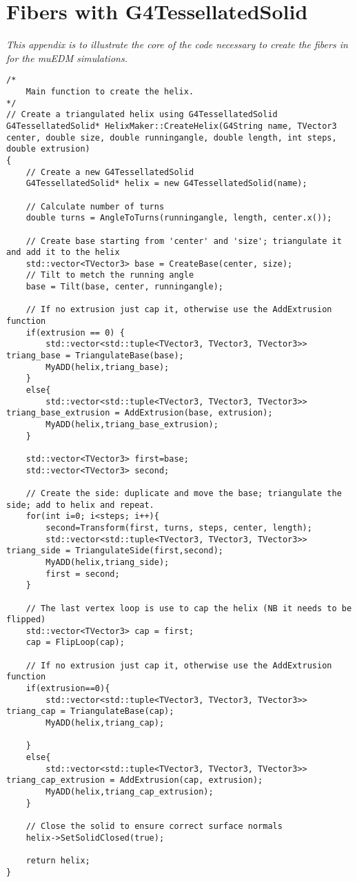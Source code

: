 
\chapter{Fibers with G4TessellatedSolid}
{\itshape
This appendix is to illustrate the core of the code necessary to create the fibers in \gf for the muEDM simulations.}
\label{ch:G4TessellatedSolid}
\begin{lstlisting}
/*
    Main function to create the helix. 
*/
// Create a triangulated helix using G4TessellatedSolid
G4TessellatedSolid* HelixMaker::CreateHelix(G4String name, TVector3 center, double size, double runningangle, double length, int steps, double extrusion)
{
    // Create a new G4TessellatedSolid
    G4TessellatedSolid* helix = new G4TessellatedSolid(name);

    // Calculate number of turns
    double turns = AngleToTurns(runningangle, length, center.x());
	
    // Create base starting from 'center' and 'size'; triangulate it and add it to the helix
	std::vector<TVector3> base = CreateBase(center, size);
    // Tilt to metch the running angle
    base = Tilt(base, center, runningangle);

    // If no extrusion just cap it, otherwise use the AddExtrusion function
    if(extrusion == 0) {
        std::vector<std::tuple<TVector3, TVector3, TVector3>> triang_base = TriangulateBase(base);
	    MyADD(helix,triang_base);
    }
    else{
        std::vector<std::tuple<TVector3, TVector3, TVector3>> triang_base_extrusion = AddExtrusion(base, extrusion);
        MyADD(helix,triang_base_extrusion);
    }

	std::vector<TVector3> first=base;
	std::vector<TVector3> second;

	// Create the side: duplicate and move the base; triangulate the side; add to helix and repeat. 
	for(int i=0; i<steps; i++){
		second=Transform(first, turns, steps, center, length);
		std::vector<std::tuple<TVector3, TVector3, TVector3>> triang_side = TriangulateSide(first,second);
		MyADD(helix,triang_side);
		first = second; 
	}

	// The last vertex loop is use to cap the helix (NB it needs to be flipped)
    std::vector<TVector3> cap = first;
    cap = FlipLoop(cap);

    // If no extrusion just cap it, otherwise use the AddExtrusion function
    if(extrusion==0){
        std::vector<std::tuple<TVector3, TVector3, TVector3>> triang_cap = TriangulateBase(cap);
	    MyADD(helix,triang_cap);
	
    }
    else{
        std::vector<std::tuple<TVector3, TVector3, TVector3>> triang_cap_extrusion = AddExtrusion(cap, extrusion);
        MyADD(helix,triang_cap_extrusion);
    }
	
    // Close the solid to ensure correct surface normals
    helix->SetSolidClosed(true);

    return helix;
}

\end{lstlisting}
